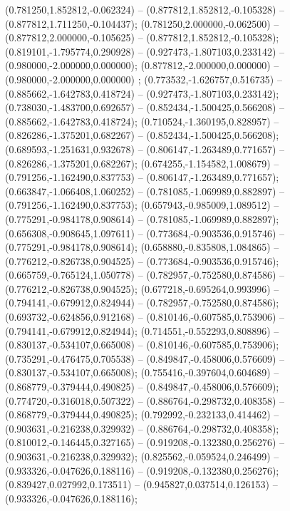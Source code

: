  (0.781250,1.852812,-0.062324) -- (0.877812,1.852812,-0.105328) -- (0.877812,1.711250,-0.104437);
 (0.781250,2.000000,-0.062500) -- (0.877812,2.000000,-0.105625) -- (0.877812,1.852812,-0.105328);
 (0.819101,-1.795774,0.290928) -- (0.927473,-1.807103,0.233142) -- (0.980000,-2.000000,0.000000);
 (0.877812,-2.000000,0.000000) -- (0.980000,-2.000000,0.000000) ;
 (0.773532,-1.626757,0.516735) -- (0.885662,-1.642783,0.418724) -- (0.927473,-1.807103,0.233142);
 (0.738030,-1.483700,0.692657) -- (0.852434,-1.500425,0.566208) -- (0.885662,-1.642783,0.418724);
 (0.710524,-1.360195,0.828957) -- (0.826286,-1.375201,0.682267) -- (0.852434,-1.500425,0.566208);
 (0.689593,-1.251631,0.932678) -- (0.806147,-1.263489,0.771657) -- (0.826286,-1.375201,0.682267);
 (0.674255,-1.154582,1.008679) -- (0.791256,-1.162490,0.837753) -- (0.806147,-1.263489,0.771657);
 (0.663847,-1.066408,1.060252) -- (0.781085,-1.069989,0.882897) -- (0.791256,-1.162490,0.837753);
 (0.657943,-0.985009,1.089512) -- (0.775291,-0.984178,0.908614) -- (0.781085,-1.069989,0.882897);
 (0.656308,-0.908645,1.097611) -- (0.773684,-0.903536,0.915746) -- (0.775291,-0.984178,0.908614);
 (0.658880,-0.835808,1.084865) -- (0.776212,-0.826738,0.904525) -- (0.773684,-0.903536,0.915746);
 (0.665759,-0.765124,1.050778) -- (0.782957,-0.752580,0.874586) -- (0.776212,-0.826738,0.904525);
 (0.677218,-0.695264,0.993996) -- (0.794141,-0.679912,0.824944) -- (0.782957,-0.752580,0.874586);
 (0.693732,-0.624856,0.912168) -- (0.810146,-0.607585,0.753906) -- (0.794141,-0.679912,0.824944);
 (0.714551,-0.552293,0.808896) -- (0.830137,-0.534107,0.665008) -- (0.810146,-0.607585,0.753906);
 (0.735291,-0.476475,0.705538) -- (0.849847,-0.458006,0.576609) -- (0.830137,-0.534107,0.665008);
 (0.755416,-0.397604,0.604689) -- (0.868779,-0.379444,0.490825) -- (0.849847,-0.458006,0.576609);
 (0.774720,-0.316018,0.507322) -- (0.886764,-0.298732,0.408358) -- (0.868779,-0.379444,0.490825);
 (0.792992,-0.232133,0.414462) -- (0.903631,-0.216238,0.329932) -- (0.886764,-0.298732,0.408358);
 (0.810012,-0.146445,0.327165) -- (0.919208,-0.132380,0.256276) -- (0.903631,-0.216238,0.329932);
 (0.825562,-0.059524,0.246499) -- (0.933326,-0.047626,0.188116) -- (0.919208,-0.132380,0.256276);
 (0.839427,0.027992,0.173511) -- (0.945827,0.037514,0.126153) -- (0.933326,-0.047626,0.188116);
